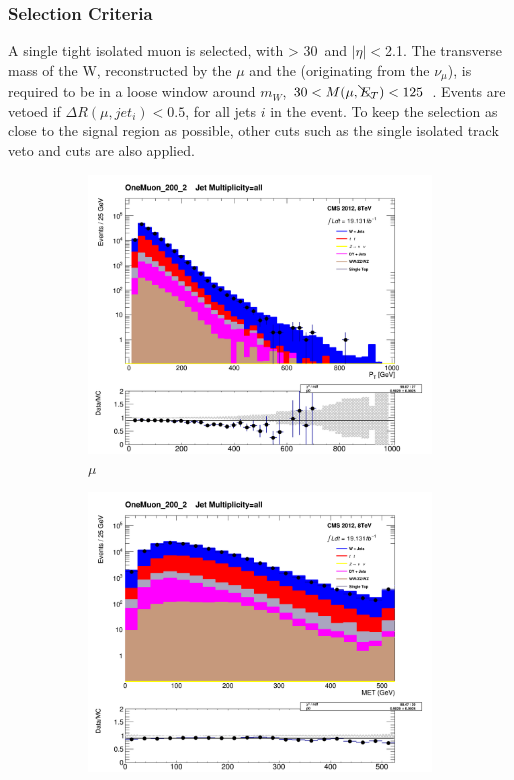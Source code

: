 \subsubsection{Selection Criteria}
\label{sec:mujets_control_selection}
A single tight isolated muon is selected, with \Pt > 30~\gev and $|\eta| <$2.1.
The transverse mass of the W, reconstructed by the 
$\mu$ and the \met (originating from the $\nu_{\mu}$), is required to be in a 
loose window around $m_W$, $30 < M(\mu, \bcancel{E}_T) < 125$~\gev. Events are vetoed if
$\Delta R(\mu, jet_{i}) < 0.5$,
for all jets $i$ in the event. To keep the selection as close to the signal 
region as possible, other cuts such as the single isolated track veto and 
\mhtmet cuts are also applied.

\begin{figure}[t]
  \centering
    \begin{subfigure}[b]{0.48\textwidth}
      \includegraphics[width=\textwidth]{Figs/datamc/mu/Stacked_MuPt_all_OneMuon_200_upwards}
      \caption{$\mu$ \Pt}
    \end{subfigure}
    \begin{subfigure}[b]{0.48\textwidth}
      \includegraphics[width=\textwidth]{Figs/datamc/mu/Stacked_MET_Corrected_all_OneMuon_200_upwards}

\end{subfigure}
\end{figure}
